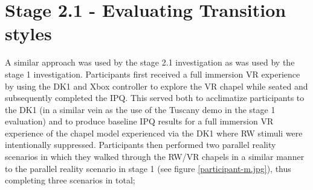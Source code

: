 



\section{Stage 2.1 - Evaluating Transition styles}

A similar approach was used by the stage 2.1 investigation as was used by the stage 1 investigation. Participants first received a full immersion VR experience by using the DK1 and Xbox controller to explore the VR chapel while seated and subsequently completed the IPQ. This served both to acclimatize participants to the DK1 (in a similar vein as the use of the Tuscany demo in the stage 1 evaluation) and to produce baseline IPQ results for a full immersion VR experience of the chapel model experienced via the DK1 where RW stimuli were intentionally suppressed. Participants then performed two parallel reality scenarios in which they walked through the RW/VR chapels in a similar manner to the parallel reality scenario in stage 1 (see figure \ref{participant-m.jpg}), thus completing three scenarios in total;

